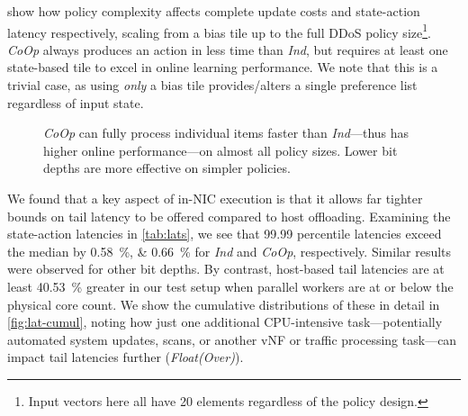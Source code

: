 \documentclass[
sigconf,natbib=false
]{acmart}
\newcommand{\Coopfw}{\emph{CoOp}}
\newcommand{\Indfw}{\emph{Ind}}
\begin{document}
 show how policy complexity affects complete update costs and state-action latency respectively, scaling from a bias tile up to the full DDoS policy size\footnote{Input vectors here all have 20 elements regardless of the policy design.}.
\Coopfw{} always produces an action in less time than \Indfw{}, but requires at least one state-based tile to excel in online learning performance.
We note that this is a trivial case, as using \emph{only} a bias tile provides/alters a single preference list regardless of input state.

\begin{figure}
	\caption{\Coopfw{} can fully process individual items faster than \Indfw{}---thus has higher online performance---on almost all policy sizes. Lower bit depths are more effective on simpler policies.\label{fig:vary-work}}
\end{figure}

We found that a key aspect of in-NIC execution is that it allows far tighter bounds on tail latency to be offered compared to host offloading.
Examining the state-action latencies in \cref{tab:lats}, we see that \num{99.99} percentile latencies exceed the median by \SIlist{0.58;0.66}{\percent} for \Indfw{} and \Coopfw{}, respectively.
Similar results were observed for other bit depths.
By contrast, host-based tail latencies are at least \SI{40.53}{\percent} greater in our test setup when parallel workers are at or below the physical core count.
We show the cumulative distributions of these in detail in \cref{fig:lat-cumul}, noting how just one additional CPU-intensive task---potentially automated system updates, scans, or another vNF or traffic processing task---can impact tail latencies further (\emph{Float(Over)}).
\end{document}
